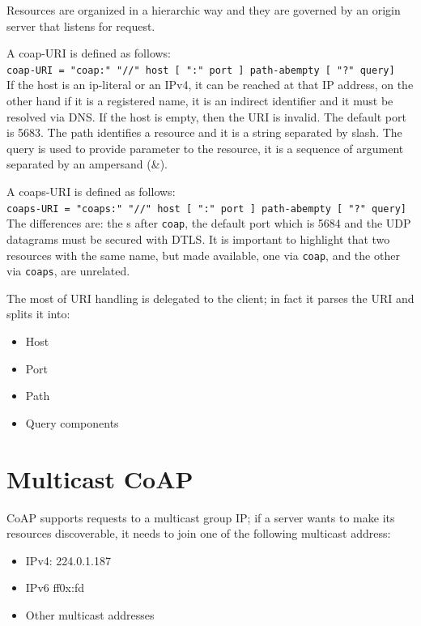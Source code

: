 	Resources are organized in a hierarchic way and they are governed by an origin server that listens for request.
	
	A coap-URI is defined as follows:\\
	\texttt{coap-URI = "coap:" "//" host [ ":" port ] path-abempty [ "?" query]}\\
	If the host is an ip-literal or an IPv4, it can be reached at that IP address, on the other hand if it is a registered name, it is an indirect identifier and it must be resolved via DNS.\newline
	If the host is empty, then the URI is invalid.\newline
	The default port is 5683.\newline
	The path identifies a resource and it is a string separated by slash.\newline
	The query is used to provide parameter to the resource, it is a sequence of argument separated by an ampersand (\&).
	
	A coaps-URI is defined as follows:\\
	\texttt{coaps-URI = "coaps:" "//" host [ ":" port ] path-abempty [ "?" query]}\\
	The differences are: the s after \texttt{coap}, the default port which is 5684 and the UDP datagrams must be secured with DTLS.
	It is important to highlight that two resources with the same name, but made available, one via \texttt{coap}, and the other via \texttt{coaps}, are unrelated.
	
	The most of URI handling is delegated to the client; in fact it parses the URI and splits it into:\newline
	\begin{itemize}
		\item Host
		\item Port
		\item Path
		\item Query components
	\end{itemize}
	
	\section{Multicast CoAP}\label{sc:multicast}
	CoAP supports requests to a multicast group IP; if a server wants to make its resources discoverable, it needs to join one of the following multicast address:
	\begin{itemize}
		\item IPv4: 224.0.1.187
		\item IPv6 ff0x:fd
		\item Other multicast addresses
	\end{itemize}

